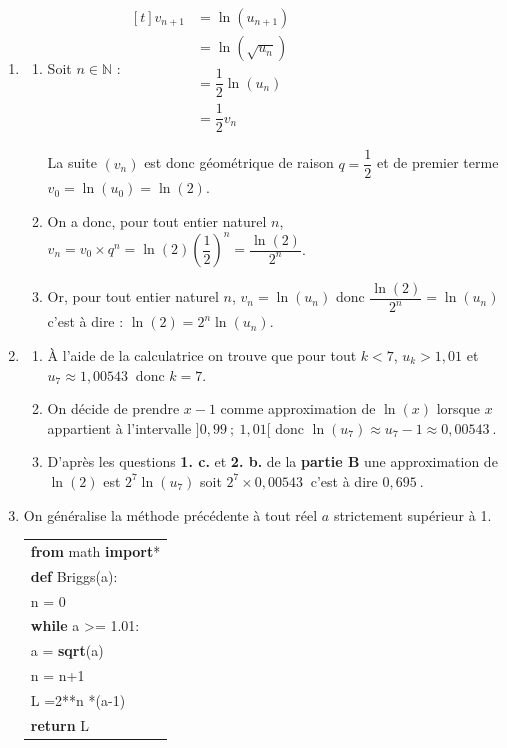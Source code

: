 \documentclass[10pt]{article}
\providecommand{\N}{\mathbb{N}}
\providecommand{\np}[2][]{{#2~#1}}
\begin{document}
\begin{enumerate}
\item
	\begin{enumerate}
		\item Soit $n \in \N$ : $\begin{aligned}[t] v_{n+1}& =\ln \left(u_{n+1}\right)\\
	&= \ln \left( \sqrt{u_{n}}\right)\\
	& = \dfrac{1}{2}\ln\left(u_n\right)\\
	&= \dfrac{1}{2}v_n
\end{aligned}$

La suite $\left(v_{n}\right)$ est donc géométrique de raison $q=\dfrac{1}{2}$ et de premier terme \linebreak $v_0=\ln\left(u_0\right)=\ln(2)$.
		\item On a donc, pour tout entier naturel $n$, $v_n=v_0\times q^n=\ln(2)\left(\dfrac{1}{2}\right)^n=\dfrac{\ln(2)}{2^n}$.
		\item  Or, pour tout entier naturel $n$,  $v_n=\ln \left(u_{n}\right)$ donc $\dfrac{\ln\left( 2 \right)}{2^n}= \ln \left(u_{n}\right)$ c'est à dire : $\ln(2)=2^n\ln\left(u_n\right)$.
	\end{enumerate}
\item
	\begin{enumerate}
		\item À l'aide de la calculatrice on trouve que pour tout $k<7$, $u_k > 1,01$ et \linebreak $u_{7}\approx \np{1,00543}$ donc $k=7$.
		\item On décide de prendre $x - 1$ comme approximation de $\ln (x)$ lorsque $x$ appartient à l'intervalle $]0,99~;~1,01[$ donc $\ln\left(u_{7}\right)\approx u_{7} - 1 \approx \np{0,00543}$.
\item D'après les questions \textbf{1. c.} et \textbf{2. b.} de la \textbf{partie B} une approximation de $\ln (2)$ est $2^7\ln\left(u_7\right)$ soit $2^7 \times \np{0,00543}$ c'est à dire $\np{0,695}$.
	\end{enumerate}
\item On généralise la méthode précédente à tout réel $a$ strictement supérieur à 1.

\begin{center}
\begin{ttfamily}
\begin{tabularx}{8cm}{|X|}\hline
\textbf{from} math \textbf{import}*\\
\textbf{def} Briggs(a):\\
\quad n = 0\\
\quad \textbf{while} a >= 1.01:\\
\quad \quad a = \textbf{sqrt}(a)\\
\quad \quad n = n+1\\
\quad L =2**n *(a-1) \\
\textbf{return} L\\ \hline
\end{tabularx}
\end{ttfamily}
\end{center}
\end{enumerate}

\bigskip
\end{document}

